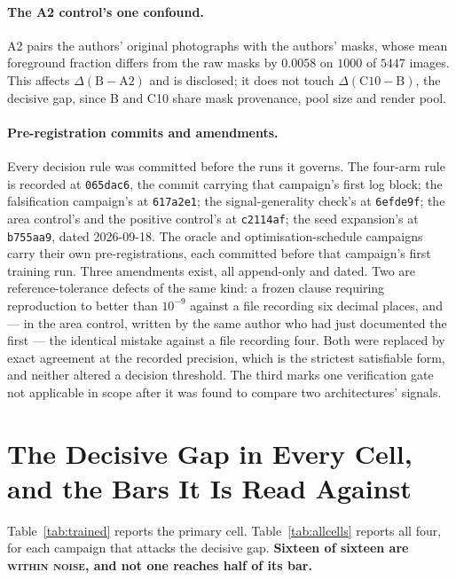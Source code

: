 \documentclass{article} %
\begin{document}
\paragraph{The A2 control's one confound.} A2 pairs the authors' original photographs with the
authors' masks, whose mean foreground fraction differs from the raw masks by $0.0058$ on $1000$ of
$5447$ images. This affects $\Delta(\mathrm{B}-\mathrm{A2})$ and is disclosed; it does not touch
$\Delta(\mathrm{C10}-\mathrm{B})$, the decisive gap, since B and C10 share mask provenance, pool
size and render pool.

\paragraph{Pre-registration commits and amendments.} Every decision rule was committed before the
runs it governs. The four-arm rule is recorded at \texttt{065dac6}, the commit carrying that
campaign's first log block; the falsification campaign's at \texttt{617a2e1}; the signal-generality
check's at \texttt{6efde9f}; the area control's and the positive control's at \texttt{c2114af}; the
seed expansion's at \texttt{b755aa9}, dated 2026-09-18. The oracle and optimisation-schedule
campaigns carry their own pre-registrations, each committed before that campaign's first training
run. Three amendments exist, all append-only and dated. Two are reference-tolerance defects of the
same kind: a frozen clause requiring reproduction to better than $10^{-9}$ against a file recording
six decimal places, and --- in the area control, written by the same author who had just documented
the first --- the identical mistake against a file recording four. Both were replaced by exact
agreement at the recorded precision, which is the strictest satisfiable form, and neither altered a
decision threshold. The third marks one verification gate not applicable in scope after it was found
to compare two architectures' signals.

\section{The Decisive Gap in Every Cell, and the Bars It Is Read Against}
\label{app:diag}

Table~\ref{tab:trained} reports the primary cell. Table~\ref{tab:allcells} reports all four, for
each campaign that attacks the decisive gap. \textbf{Sixteen of sixteen are \textsc{within noise},
and not one reaches half of its bar.}
\end{document}
